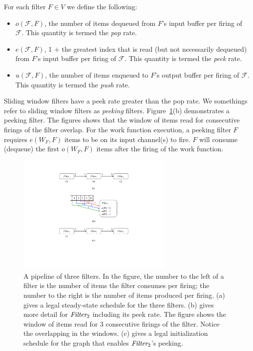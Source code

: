 For each filter $F \in V$ we define the following:
\begin{itemize}

\item $o(\mathcal{F}, F)$, the number of items dequeued from $F$'s
input buffer per firing of $\mathcal{F}$.  This quantity is termed the
{\it pop} rate.

\item $e(\mathcal{F}, F)$, 1 $+$ the greatest index that is read (but
  not necessarily dequeued) from $F$'s input buffer per firing of
  $\mathcal{F}$.  This quantity is termed the {\it peek} rate.

\item $u(\mathcal{F}, F)$, the number of items enqueued to $F$'s
output buffer per firing of $\mathcal{F}$.  This quantity is termed
the {\it push} rate.

\end{itemize}

\noindent Sliding window filters have a peek rate greater than the pop
rate.  We somethings refer to sliding window filters as {\it peeking}
filters. Figure~\ref{fig:pipeline-example}(b)
demonstrates a peeking filter.  The figures shows that the window of
items read for consecutive firings of the filter overlap.  For the
work function execution, a peeking filter $F$ requires $e(W_F, F)$
items to be on its input channel(s) to fire.  $F$ will consume
(dequeue) the first $o(W_F, F)$ items after the firing of the work function.

\begin{figure}[t]
\centering
\includegraphics[width=3.0in]{figures/pipeline-example.pdf}
\caption[A pipeline of three filters with schedules.]{A pipeline of
  three filters.  In the figure, the number to the left of a filter is
  the number of items the filter consumes per firing; the number to
  the right is the number of items produced per firing.  (a) gives a
  legal steady-state schedule for the three filters.  (b) gives more
  detail for $\mbox{\it Filter}_2$ including its peek rate.  The figure
  shows the window of items read for 3 consecutive firings of the
  filter.  Notice the overlapping in the windows.  (c) gives a
  legal initialization schedule for the graph that enables
  $\mbox{\it Filter}_2$'s peeking. 
\label{fig:pipeline-example}}
\end{figure}


